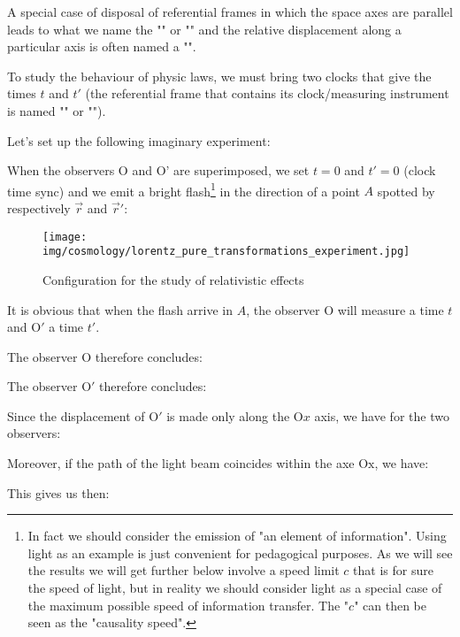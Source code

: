 		\begin{tcolorbox}[title=Remark,colframe=black,arc=10pt]
		A special case of disposal of referential frames in which the space axes are parallel leads to what we name the "" or "" and the relative displacement along a particular axis is often named a "".
		\end{tcolorbox}	
		
		To study the behaviour of physic laws, we must bring two clocks that give the times $t$ and $t'$ (the referential frame that contains its clock/measuring instrument is named "" or "").
		
		Let's set up the following imaginary experiment:
		
		When the observers $\text{O}$ and $\text{O'}$ are superimposed, we set $t = 0$ and $t' = 0$ (clock time sync) and we emit a bright flash\footnote{In fact we should consider the emission of "an element of information". Using light as an example is just convenient for pedagogical purposes. As we will see the results we will get further below involve a speed limit $c$ that is for sure the speed of light, but in reality we should consider light as a special case of the maximum possible speed of information transfer. The "$c$" can then be seen as the "causality speed".} in the direction of a point $A$ spotted by respectively $\vec{r}$ and $\vec{r}'$:
		\begin{figure}[H]
			\centering
			\texttt{[image: img/cosmology/lorentz\_pure\_transformations\_experiment.jpg]}	
			\caption{Configuration for the study of relativistic effects}
		\end{figure}
		It is obvious that when the flash arrive in $A$, the observer $\text{O}$ will measure a time $t$ and $\text{O}'$ a time $t'$.
		
		The observer $\text{O}$ therefore concludes:
		
		The observer $\text{O}'$ therefore concludes:
		
		Since the displacement of $\text{O}'$ is made only along the $\text{O}x$ axis, we have for the two observers:
		
		Moreover, if the path of the light beam coincides within the axe $\text{Ox}$, we have:
		
		This gives us then:
		
